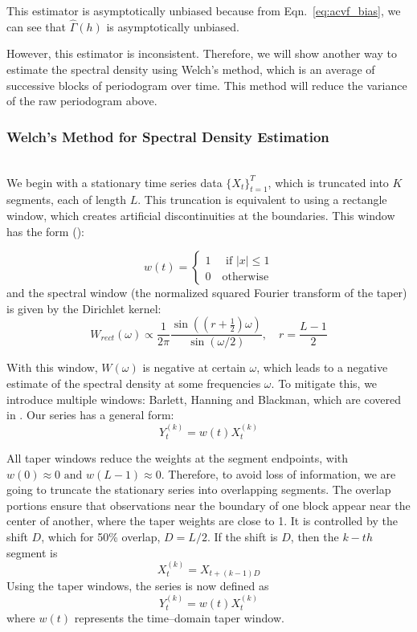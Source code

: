 \documentclass[preprint]{aastex}
\theoremstyle{nonitalicname}
\theoremstyle{plain}
\theoremstyle{remark}
\begin{document}
This estimator is asymptotically unbiased because from  Eqn.~\ref{eq:acvf_bias}, we can see that $\widehat \Gamma(h)$ is asymptotically unbiased. 

However, this estimator is inconsistent. Therefore, we will show another way to estimate the spectral density using Welch's method, which is an average of successive blocks of periodogram over time. This method will reduce the variance of the raw periodogram above. 

\subsubsection{Welch's Method for Spectral Density Estimation}
 \\
We begin with a stationary time series data $\{ X_t\}_{t=1}^T$, which is truncated into $K$ segments, each of length $L$. This truncation is equivalent to using a rectangle window, which creates artificial discontinuities at the boundaries. This window has the form (\cite{brockwelldavis2016}):

\begin{equation}
w(t) = 
    \begin{cases}
        1 \quad \text{ if } |x| \leq 1 \\
        0 \quad\text{otherwise}
    \end{cases}
\end{equation}
and the spectral window (the normalized squared Fourier transform of the taper) is given by the Dirichlet kernel:
\begin{equation}\label{eq:w_rect}
    W_{rect}(\omega) \propto \frac{1}{2 \pi} \frac{\sin((r+\frac{1}{2})\omega)}{\sin(\omega/2)}, \quad r = \frac{L-1}{2}
\end{equation}

With this window, $W(\omega)$ is negative at certain $\omega$, which leads to a negative estimate of the spectral density at some frequencies $\omega$. To mitigate this, we introduce multiple windows: Barlett, Hanning and Blackman, which are covered in \cite{harris1978}.
Our series has a general form:
\begin{equation}
    Y_t^{(k)} = w(t) X_t^{(k)}
\end{equation}

All taper windows reduce the weights at the segment endpoints, with $w(0) \approx 0 \text{ and } w(L-1)\approx 0$. Therefore, to avoid loss of information, we are going to truncate the stationary series into overlapping segments. The overlap portions ensure that observations near the boundary of one block appear near the center of another, where the taper weights are close to 1. It is controlled by the shift $D$, which for 50\% overlap, $D=L/2$. If the shift is $D$, then the $k-th$ segment is
\begin{equation}
    X_t^{(k)} = X_{t+(k-1)D}
\end{equation}
Using the taper windows, the series is now defined as
\begin{equation}
    Y_t^{(k)} = w(t) X_t^{(k)}
\end{equation}
where $w(t)$ represents the time--domain taper window. 
\end{document}

